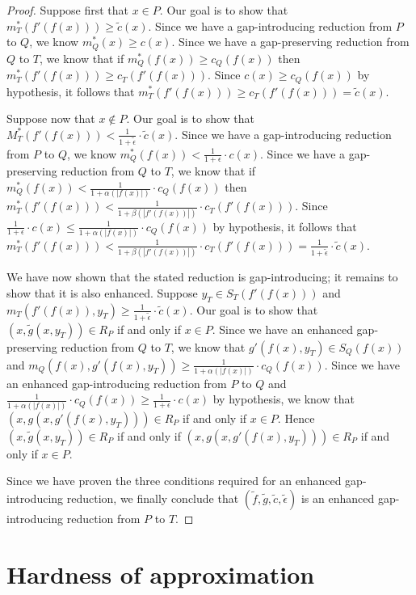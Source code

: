 \documentclass[]{article}
\theoremstyle{plain}
\theoremstyle{definition}
\begin{document}
\begin{proof}
  Suppose first that $x \in P$.
  Our goal is to show that $m^*_T(f'(f(x))) \geq \tilde{c}(x)$.
  Since we have a gap-introducing reduction from $P$ to $Q$, we know $m^*_Q(x) \geq c(x)$.
  Since we have a gap-preserving reduction from $Q$ to $T$, we know that if $m^*_Q(f(x)) \geq c_Q(f(x))$ then $m^*_T(f'(f(x))) \geq c_T(f'(f(x)))$.
  Since $c(x) \geq c_Q(f(x))$ by hypothesis, it follows that $m^*_T(f'(f(x))) \geq c_T(f'(f(x))) = \tilde{c}(x)$.

  Suppose now that $x \notin P$.
  Our goal is to show that $M^*_T(f'(f(x))) < \frac{1}{1 + \tilde{\epsilon}} \cdot \tilde{c}(x)$.
  Since we have a gap-introducing reduction from $P$ to $Q$, we know $m^*_Q(f(x)) < \frac{1}{1 + \epsilon} \cdot c(x)$.
  Since we have a gap-preserving reduction from $Q$ to $T$, we know that if $m^*_Q(f(x)) < \frac{1}{1 + \alpha(|f(x)|)} \cdot c_Q(f(x))$ then $m^*_T(f'(f(x))) < \frac{1}{1 + \beta(|f'(f(x))|)} \cdot c_T(f'(f(x)))$.
  Since $\frac{1}{1 + \epsilon} \cdot c(x) \leq \frac{1}{1 + \alpha(|f(x)|)} \cdot c_Q(f(x))$ by hypothesis, it follows that $m^*_T(f'(f(x))) < \frac{1}{1 + \beta(|f'(f(x))|)} \cdot c_T(f'(f(x))) = \frac{1}{1 + \tilde{\epsilon}} \cdot \tilde{c}(x)$.

  We have now shown that the stated reduction is gap-introducing; it remains to show that it is also enhanced.
  Suppose $y_T \in S_T(f'(f(x)))$ and $m_T(f'(f(x)), y_T) \geq \frac{1}{1 + \tilde{\epsilon}} \cdot \tilde{c}(x)$.
  Our goal is to show that $(x, \tilde{g}(x, y_T)) \in R_P$ if and only if $x \in P$.
  Since we have an enhanced gap-preserving reduction from $Q$ to $T$, we know that $g'(f(x), y_T) \in S_Q(f(x))$ and $m_Q(f(x), g'(f(x), y_T)) \geq \frac{1}{1 + \alpha(|f(x)|)} \cdot c_Q(f(x))$.
  Since we have an enhanced gap-introducing reduction from $P$ to $Q$ and $\frac{1}{1 + \alpha(|f(x)|)} \cdot c_Q(f(x)) \geq \frac{1}{1 + \epsilon} \cdot c(x)$ by hypothesis, we know that $(x, g(x, g'(f(x), y_T))) \in R_P$ if and only if $x \in P$.
  Hence $(x, \tilde{g}(x, y_T)) \in R_P$ if and only if $(x, g(x, g'(f(x), y_T))) \in R_P$ if and only if $x \in P$.

  Since we have proven the three conditions required for an enhanced gap-introducing reduction, we finally conclude that $(\tilde{f}, \tilde{g}, \tilde{c}, \tilde{\epsilon})$ is an enhanced gap-introducing reduction from $P$ to $T$.
\end{proof}

\section{Hardness of approximation}\label{sec:hardness}
\end{document}
